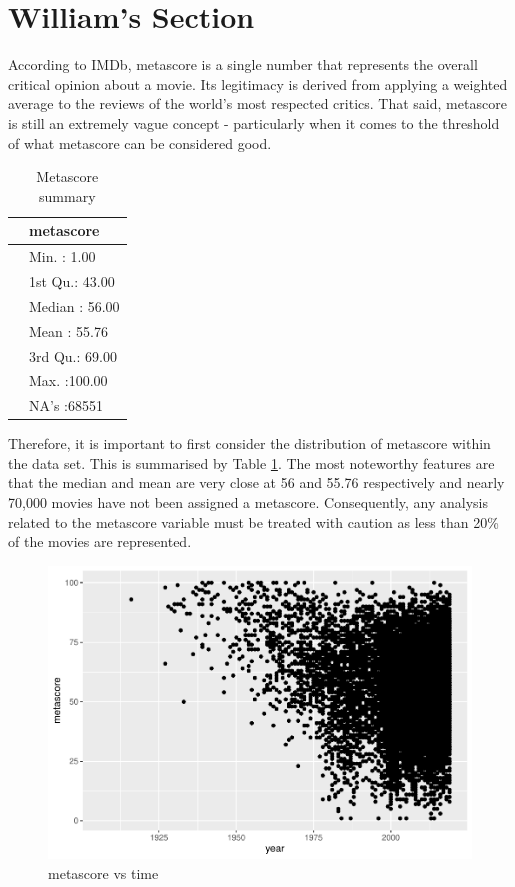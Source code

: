 \documentclass[11pt,a4paper,]{article}
\begin{document}
\hypertarget{williams-section}{%
\section{William's Section}\label{williams-section}}

According to IMDb, metascore is a single number that represents the overall critical opinion about a movie. Its legitimacy is derived from applying a weighted average to the reviews of the world's most respected critics. That said, metascore is still an extremely vague concept - particularly when it comes to the threshold of what metascore can be considered good.

\begin{table}

\caption{\label{tab:metascoretable}Metascore summary}
\centering
\begin{tabular}[t]{l|l}
\hline
  &   metascore\\
\hline
 & Min.   :  1.00\\
\hline
 & 1st Qu.: 43.00\\
\hline
 & Median : 56.00\\
\hline
 & Mean   : 55.76\\
\hline
 & 3rd Qu.: 69.00\\
\hline
 & Max.   :100.00\\
\hline
 & NA's   :68551\\
\hline
\end{tabular}
\end{table}

Therefore, it is important to first consider the distribution of metascore within the data set. This is summarised by Table \ref{tab:metascoretable}. The most noteworthy features are that the median and mean are very close at 56 and 55.76 respectively and nearly 70,000 movies have not been assigned a metascore. Consequently, any analysis related to the metascore variable must be treated with caution as less than 20\% of the movies are represented.

\begin{figure}
\centering
\includegraphics{Report_files/figure-latex/metascorescatterplot-1.pdf}
\caption{\label{fig:metascorescatterplot}metascore vs time}
\end{figure}
\end{document}
